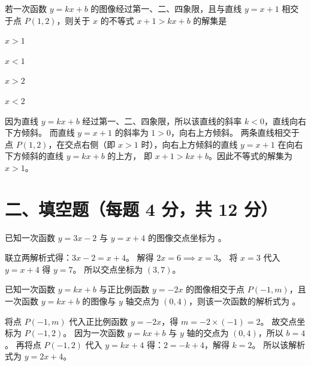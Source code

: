 \documentclass{exam-zh}
\begin{document}
\begin{question}[points=4]
  若一次函数 $y = kx + b$ 的图像经过第一、二、四象限，且与直线 $y = x + 1$ 相交于点 $P(1, 2)$，则关于 $x$ 的不等式 $x + 1 > kx + b$ 的解集是
  \begin{choices}
    \item $x > 1$
    \item $x < 1$
    \item $x > 2$
    \item $x < 2$
  \end{choices}
  \paren[A]
  \begin{solutionblock}
    因为直线 $y = kx + b$ 经过第一、二、四象限，所以该直线的斜率 $k < 0$，直线向右下方倾斜。
而直线 $y = x + 1$ 的斜率为 $1 > 0$，向右上方倾斜。
两条直线相交于点 $P(1, 2)$，在交点右侧（即 $x > 1$ 时），向右上方倾斜的直线 $y = x + 1$ 在向右下方倾斜的直线 $y = kx + b$ 的上方，
即 $x + 1 > kx + b$。因此不等式的解集为 $x > 1$。

  \end{solutionblock}
\end{question}


\section*{二、填空题（每题 4 分，共 12 分）}


\begin{question}[points=4]
  已知一次函数 $y = 3x - 2$ 与 $y = x + 4$ 的图像交点坐标为 \underline{\quad\quad}。
  \paren[$(3, 7)$]
  \begin{solutionblock}
    联立两解析式得：$3x - 2 = x + 4$。
解得 $2x = 6 \implies x = 3$。
将 $x = 3$ 代入 $y = x + 4$ 得 $y = 7$。
所以交点坐标为 $(3, 7)$。

  \end{solutionblock}
\end{question}



\begin{question}[points=4]
  已知一次函数 $y = kx + b$ 与正比例函数 $y = -2x$ 的图像相交于点 $P(-1, m)$，且一次函数 $y = kx + b$ 的图像与 $y$ 轴交点为 $(0, 4)$，则该一次函数的解析式为 \underline{\quad\quad}。
  \paren[$y = 2x + 4$]
  \begin{solutionblock}
    将点 $P(-1, m)$ 代入正比例函数 $y = -2x$，得 $m = -2 \times (-1) = 2$。
故交点坐标为 $P(-1, 2)$。
因为一次函数 $y = kx + b$ 与 $y$ 轴的交点为 $(0, 4)$，所以 $b = 4$。
再将点 $P(-1, 2)$ 代入 $y = kx + 4$ 得：$2 = -k + 4$，解得 $k = 2$。
所以该解析式为 $y = 2x + 4$。

  \end{solutionblock}
\end{question}
\end{document}
